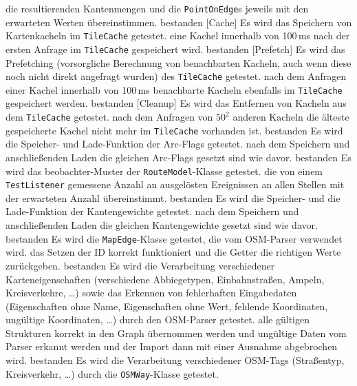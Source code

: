 \documentclass[a4paper, 11pt]{article}
\newcommand{\code}[1]{\texttt{#1}}
\begin{document}
\begin{itemize}
     {die resultierenden Kantenmengen und die \code{PointOnEdge}s jeweils mit den erwarteten Werten übereinstimmen.}
     {bestanden}
[Cache]
     {Es wird das Speichern von Kartenkacheln im \code{TileCache} getestet.}
     {eine Kachel innerhalb von 100\,ms nach der ersten Anfrage im \code{TileCache} gespeichert wird.}
     {bestanden}
[Prefetch]
     {Es wird das Prefetching (vorsorgliche Berechnung von benachbarten Kacheln, auch wenn diese noch nicht direkt angefragt wurden) des \code{TileCache} getestet.}
     {nach dem Anfragen einer Kachel innerhalb von 100\,ms benachbarte Kacheln ebenfalls im \code{TileCache} gespeichert werden.}
     {bestanden}
[Cleanup]
     {Es wird das Entfernen von Kacheln aus dem \code{TileCache} getestet.}
     {nach dem Anfragen von $50^2$ anderen Kacheln die älteste gespeicherte Kachel nicht mehr im \code{TileCache} vorhanden ist.}
     {bestanden}
     {Es wird die Speicher- und Lade-Funktion der Arc-Flags getestet.}
     {nach dem Speichern und anschließenden Laden die gleichen Arc-Flags gesetzt sind wie davor.}
     {bestanden}
     {Es wird das \gls{beobachter}-Muster der \code{RouteModel}-Klasse getestet.}
     {die von einem \code{TestListener} gemessene Anzahl an ausgelösten Ereignissen an allen Stellen mit der erwarteten Anzahl übereinstimmt.}
     {bestanden}
     {Es wird die Speicher- und die Lade-Funktion der Kantengewichte getestet.}
     {nach dem Speichern und anschließenden Laden die gleichen Kantengewichte gesetzt sind wie davor.}
     {bestanden}
     {Es wird die \code{MapEdge}-Klasse getestet, die vom OSM-Parser verwendet wird.}
     {das Setzen der ID korrekt funktioniert und die Getter die richtigen Werte zurückgeben.}
     {bestanden}
     {Es wird die Verarbeitung verschiedener Karteneigenschaften (verschiedene Abbiegetypen, Einbahnstraßen, Ampeln, Kreisverkehre, \dots) sowie das Erkennen von fehlerhaften Eingabedaten (Eigenschaften ohne Name, Eigenschaften ohne Wert, fehlende Koordinaten, ungültige Koordinaten, \dots) durch den OSM-Parser getestet.}
     {alle gültigen Strukturen korrekt in den Graph übernommen werden und ungültige Daten vom Parser erkannt werden und der Import dann mit einer Ausnahme abgebrochen wird.}
     {bestanden}
     {Es wird die Verarbeitung verschiedener OSM-Tags (Straßentyp, Kreisverkehr, \dots) durch die \code{OSMWay}-Klasse getestet.}

\end{itemize}
\end{document}
